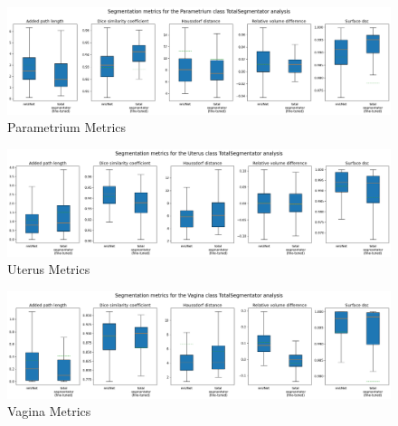 \documentclass[12pt,twoside]{report}
\begin{document}
\begin{landscape}
  \begin{figure}[H]
    \centering
    \includegraphics[width=\linewidth]{../../research/source/code/data/metrics/metricsparametrium_1_combinednotable_TotalSegmentator_analysis.png}
    \caption{Parametrium Metrics}\label{fig:totalsegmentator-metrics-parametrium}
  \end{figure}

  \begin{figure}[H]
    \centering
    \includegraphics[width=\linewidth]{../../research/source/code/data/metrics/metricsuterus_1_combinednotable_TotalSegmentator_analysis.png}
    \caption{Uterus Metrics}\label{fig:totalsegmentator-metrics-uterus}
  \end{figure}

  \begin{figure}[H]
    \centering
    \includegraphics[width=\linewidth]{../../research/source/code/data/metrics/metricsvagina_1_combinednotable_TotalSegmentator_analysis.png}
    \caption{Vagina Metrics}\label{fig:totalsegmentator-metrics-vagina}
  \end{figure}

\end{landscape}
\end{document}
